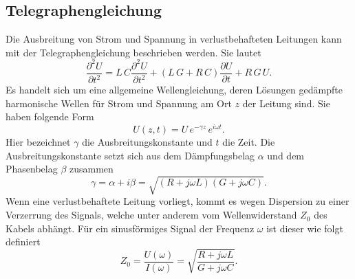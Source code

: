 \subsection{Telegraphengleichung}
Die Ausbreitung von Strom und Spannung in verlustbehafteten Leitungen kann mit der Telegraphengleichung beschrieben werden. Sie lautet
\begin{equation}
  \frac{\partial^2 U}{\partial t^2} = L\,C\frac{\partial^2 U}{\partial t^2}+(L\,G + R\,C)\frac{\partial U}{\partial t}+R\,G\,U.
\end{equation}
Es handelt sich um eine allgemeine Wellengleichung, deren Lösungen gedämpfte harmonische Wellen für Strom und Spannung am Ort $z$ der Leitung sind. Sie haben folgende Form
\begin{equation}
  U(z,t)=U\,e^{-\gamma z}\,e^{i\omega t}.
\end{equation}
Hier bezeichnet $\gamma$ die Ausbreitungskonstante und $t$ die Zeit. Die Ausbreitungskonstante setzt sich aus dem Dämpfungsbelag $\alpha$ und dem Phasenbelag $\beta$ zusammen
\begin{equation}
  \gamma =\alpha+i\beta=\sqrt{(R+j\omega L)(G+j\omega C)}.
\end{equation}
Wenn eine verlustbehaftete Leitung vorliegt, kommt es wegen Dispersion zu einer Verzerrung des Signals, welche unter anderem vom Wellenwiderstand $Z_0$ des Kabels abhängt. Für ein sinusförmiges Signal der Frequenz $\omega$ ist dieser wie folgt definiert
\begin{equation}
  Z_0=\frac{U(\omega)}{I(\omega)}=\sqrt{\frac{R+j\omega L}{G+j\omega C}}.
\end{equation}

